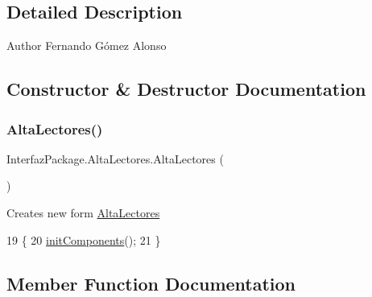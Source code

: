\subsection{Detailed Description}
\begin{DoxyAuthor}{Author}
Fernando Gómez Alonso 
\end{DoxyAuthor}


\subsection{Constructor \& Destructor Documentation}
\mbox{\label{class_interfaz_package_1_1_alta_lectores_a3cec38f19ea0fbf8c48d9af5911441de}} 
\subsubsection{\texorpdfstring{Alta\+Lectores()}{AltaLectores()}}
{\footnotesize\ttfamily Interfaz\+Package.\+Alta\+Lectores.\+Alta\+Lectores (\begin{DoxyParamCaption}{ }\end{DoxyParamCaption})\hspace{0.3cm}{\ttfamily [inline]}}

Creates new form \mbox{\hyperlink{class_interfaz_package_1_1_alta_lectores}{Alta\+Lectores}} 
\begin{DoxyCode}
19                           \{
20         \mbox{\hyperlink{class_interfaz_package_1_1_alta_lectores_a5322210114e54c48c48a09b645628a06}{initComponents}}();
21     \}
\end{DoxyCode}


\subsection{Member Function Documentation}
\mbox{\label{class_interfaz_package_1_1_alta_lectores_a5322210114e54c48c48a09b645628a06}} 
